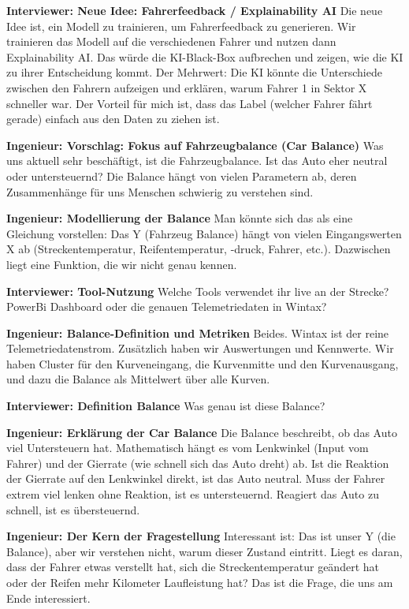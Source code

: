 \textbf{Interviewer: Neue Idee: Fahrerfeedback / Explainability AI}
Die neue Idee ist, ein Modell zu trainieren, um Fahrerfeedback zu generieren. Wir trainieren das Modell auf die verschiedenen Fahrer und nutzen dann Explainability AI. Das würde die KI-Black-Box aufbrechen und zeigen, wie die KI zu ihrer Entscheidung kommt. Der Mehrwert: Die KI könnte die Unterschiede zwischen den Fahrern aufzeigen und erklären, warum Fahrer 1 in Sektor X schneller war. Der Vorteil für mich ist, dass das Label (welcher Fahrer fährt gerade) einfach aus den Daten zu ziehen ist.

\textbf{Ingenieur: Vorschlag: Fokus auf Fahrzeugbalance (Car Balance)}
Was uns aktuell sehr beschäftigt, ist die Fahrzeugbalance. Ist das Auto eher neutral oder untersteuernd? Die Balance hängt von vielen Parametern ab, deren Zusammenhänge für uns Menschen schwierig zu verstehen sind.

\textbf{Ingenieur: Modellierung der Balance}
Man könnte sich das als eine Gleichung vorstellen: Das Y (Fahrzeug Balance) hängt von vielen Eingangswerten X ab (Streckentemperatur, Reifentemperatur, -druck, Fahrer, etc.). Dazwischen liegt eine Funktion, die wir nicht genau kennen.

\textbf{Interviewer: Tool-Nutzung}
Welche Tools verwendet ihr live an der Strecke? PowerBi Dashboard oder die genauen Telemetriedaten in Wintax?

\textbf{Ingenieur: Balance-Definition und Metriken}
Beides. Wintax ist der reine Telemetriedatenstrom. Zusätzlich haben wir Auswertungen und Kennwerte. Wir haben Cluster für den Kurveneingang, die Kurvenmitte und den Kurvenausgang, und dazu die Balance als Mittelwert über alle Kurven.

\textbf{Interviewer: Definition Balance}
Was genau ist diese Balance?

\textbf{Ingenieur: Erklärung der Car Balance}
Die Balance beschreibt, ob das Auto viel Untersteuern hat. Mathematisch hängt es vom Lenkwinkel (Input vom Fahrer) und der Gierrate (wie schnell sich das Auto dreht) ab. Ist die Reaktion der Gierrate auf den Lenkwinkel direkt, ist das Auto neutral. Muss der Fahrer extrem viel lenken ohne Reaktion, ist es untersteuernd. Reagiert das Auto zu schnell, ist es übersteuernd.

\textbf{Ingenieur: Der Kern der Fragestellung}
Interessant ist: Das ist unser Y (die Balance), aber wir verstehen nicht, warum dieser Zustand eintritt. Liegt es daran, dass der Fahrer etwas verstellt hat, sich die Streckentemperatur geändert hat oder der Reifen mehr Kilometer Laufleistung hat? Das ist die Frage, die uns am Ende interessiert.

